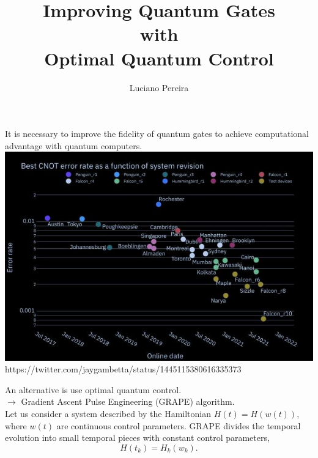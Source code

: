 \documentclass[12pt,aspectratio=169]{beamer}
\title{ Improving Quantum Gates\\ with\\ Optimal Quantum Control}
\author{\large Luciano Pereira}
\date{}
\begin{document}
	
	\begin{frame}
		\titlepage
	\end{frame}

	\begin{frame}
		\centering
		It is necessary to improve the fidelity of quantum gates to achieve computational advantage with quantum computers. \\
		\vspace{.5cm}
		\includegraphics[scale=0.4]{cnot_ibm.jpg}\\
		{\scriptsize  https://twitter.com/jaygambetta/status/1445115380616335373 }
	\end{frame}

	\begin{frame}
		An alternative is use optimal quantum control.\\
		\vspace{.5cm}
		$\rightarrow$ Gradient Ascent Pulse Engineering (GRAPE) algorithm.\\
		\vspace{.5cm}
		Let us consider a system described by the Hamiltonian $H(t)=H(w(t))$, where $w(t)$ are continuous control parameters. GRAPE divides the temporal evolution into small temporal pieces with constant control parameters,
		\begin{equation*}
			H(t_k) = H_k(w_k).
		\end{equation*}
		
	\end{frame}
\end{document}
